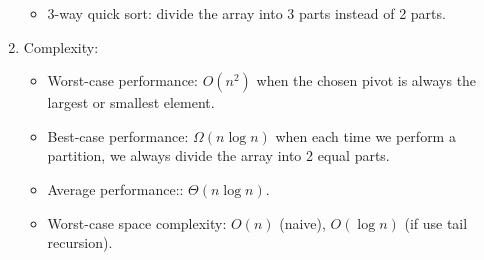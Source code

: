 \documentclass[12pt]{article}
\begin{document}
\begin{enumerate}
        \begin{itemize}
            \item 3-way quick sort: divide the array into 3 parts instead of 2 parts.
        \end{itemize}
        \item Complexity:
        \begin{itemize}
            \item Worst-case performance: $O(n^2)$ when the chosen pivot is always the largest or smallest element.
            \item Best-case performance: $\Omega(n\log n)$ when each time we perform a partition, we always divide the array into 2 equal parts.
            \item Average performance:: $\Theta(n\log n)$.
            \item Worst-case space complexity: $O(n)$ (naive), $O(\log n)$ (if use tail recursion).
        \end{itemize}
    \end{enumerate}
\end{document}
